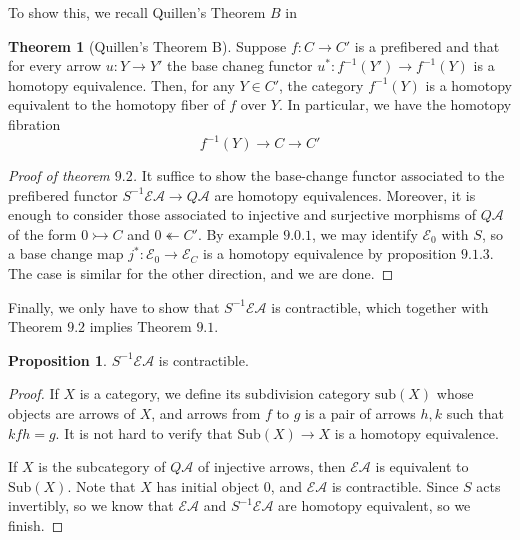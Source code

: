 \documentclass{article}
\theoremstyle{definition}
\newtheorem{theorem}{Theorem}[section]
\theoremstyle{definition}
\theoremstyle{definition}
\theoremstyle{definition}
\newtheorem{proposition}{Proposition}[theorem]
\theoremstyle{definition}
\theoremstyle{definition}
\theoremstyle{definition}
\begin{document}
To show this, we recall Quillen's Theorem $B$ in \cite{Quillen}


\begin{tcolorbox}[colback=red!5!white,colframe=red!30!white]
\begin{theorem}[Quillen's Theorem B]
Suppose $f: C\to C'$ is a prefibered and that for every arrow $u: Y\to Y'$ the base chaneg functor $u^*: f^{-1}(Y')\to f^{-1}(Y)$ is a homotopy equivalence. Then, for any $Y\in C'$, the category $f^{-1}(Y)$ is a homotopy equivalent to the homotopy fiber of $f$ over $Y$. In particular, we have the homotopy fibration
\[f^{-1}(Y)\to C\to C'\]
\end{theorem}
\end{tcolorbox}
\begin{proof}[Proof of theorem $9.2$]
    It suffice to show the base-change functor associated to the prefibered functor $S^{-1}\mathcal{E}\mathcal{A}\to Q \mathcal{A}$ are homotopy equivalences. Moreover, it is enough to consider those associated to injective and surjective morphisms of $Q \mathcal{A}$ of the form $0\rightarrowtail C$ and $0\twoheadleftarrow C'$. By example $9.0.1$, we may identify $\mathcal{E}_0$ with $S$, so a base change map $j^*: \mathcal{E}_0\to \mathcal{E}_C$ is a homotopy equivalence by proposition $9.1.3$. The case is similar for the other direction, and we are done.
\end{proof}

Finally, we only have to show that $S^{-1}\mathcal{E}\mathcal{A}$ is contractible, which together with Theorem $9.2$ implies Theorem $9.1$. 


\begin{tcolorbox}[colback=blue!5!white,colframe=blue!30!white]
\begin{proposition}
$S^{-1}\mathcal{E}\mathcal{A}$ is contractible.
\end{proposition}
\end{tcolorbox}
\begin{proof}
    If $X$ is a category, we define its subdivision category $\textrm{sub}(X)$ whose objects are arrows of $X$, and arrows from $f$ to  $g$ is a pair of arrows $h,k$ such that $kfh=g$. It is not hard to verify that $\textrm{Sub}(X)\to X$ is a homotopy equivalence. 

    If $X$ is the subcategory of $Q \mathcal{A}$ of injective arrows, then $\mathcal{E}\mathcal{A}$ is equivalent to $\textrm{Sub} (X)$. Note that $X$ has initial object $0$, and $\mathcal{E}\mathcal{A}$ is contractible. Since $S$ acts invertibly, so we know that $\mathcal{E} \mathcal{A}$ and $S^{-1}\mathcal{E} \mathcal{A}$ are homotopy equivalent, so we finish.
\end{proof}


















\printbibliography
\end{document}

